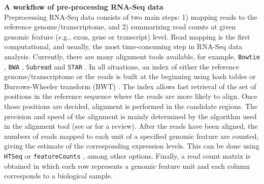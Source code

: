 \textbf{A workflow of pre-processing RNA-Seq data}\\
Preprocessing RNA-Seq data consists of two main steps: 1) mapping reads to the reference
genome/transcriptome, and 2) summarizing read counts at given genomic feature (e.g., exon, gene or
transcript) level. Read mapping is the first computational, and usually, the most time-consuming
step in RNA-Seq data analysis. Currently, there are many alignment tools available, for example,
\verb|Bowtie| \citep{langmead2012fast,langmead2009ultrafast}, \verb|BWA| 
\citep{li2013aligning,li2009fast},
\verb|Subread| \citep{shi2013subread} and \verb|STAR| \citep{dobin2013star}. In all situations, an 
index of either
the reference genome/transcriptome or the reads is built at the beginning using hash tables or 
Burrows-Wheeler
transform (BWT) \citep{burrows1994block}. The index allows fast retrieval of the set of positions in
the reference sequence where the reads are more likely to align. Once those positions are decided,
alignment is performed in the candidate regions. The precision and speed of the alignment is mainly
determined by the algorithm used in the alignment tool (see \citep{hatem2013benchmarking} or
\cite{li2010survey} for a review). After the reads have been aligned, the numbers of reads mapped to
each unit of a specified genomic feature are counted, giving the estimate of the corresponding
expression levels. This can be done using \verb|HTSeq| \cite{anders2010htseq} or 
\verb|featureCounts| 
\citep{liao2013featurecounts}, among other options. Finally, a read count matrix is
obtained in which each row represents a genomic feature unit and each column corresponds to a 
biological
sample. 


